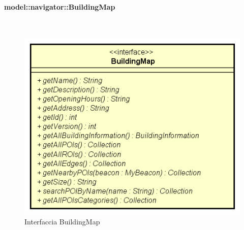 \documentclass[../DefinizioneDiProdotto.tex]{subfiles}
\begin{document}
\paragraph{model::navigator::BuildingMap}
\
\begin{figure}[H]
	\centering
	\includegraphics[width=\maxwidth]{img/BuildingMap.png}
	\caption{Interfaccia BuildingMap}\label{fig:model::navigator::BuildingMap} 
\end{figure}
\end{document}
